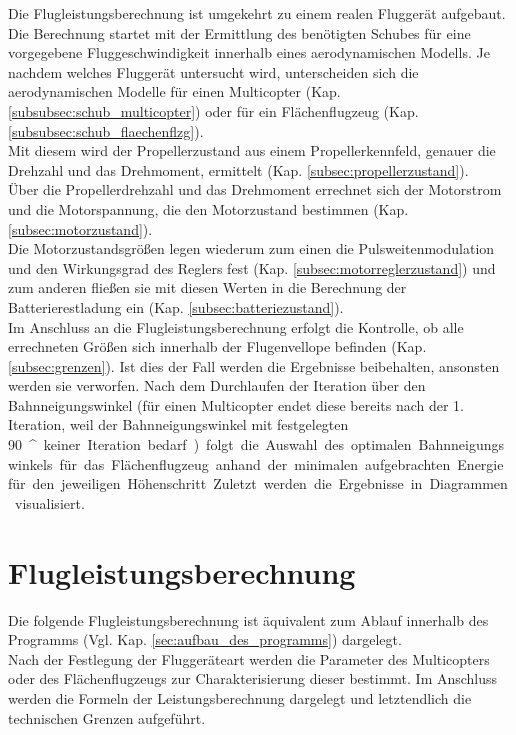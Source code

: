 Die Flugleistungsberechnung ist umgekehrt zu einem realen Fluggerät aufgebaut.
Die Berechnung startet mit der Ermittlung des benötigten Schubes für eine vorgegebene Fluggeschwindigkeit innerhalb eines aerodynamischen Modells. Je nachdem welches Fluggerät untersucht wird, unterscheiden sich die aerodynamischen Modelle für einen Multicopter (Kap. \ref{subsubsec:schub_multicopter}) oder für ein Flächenflugzeug (Kap. \ref{subsubsec:schub_flaechenflzg}). \\
Mit diesem wird der Propellerzustand aus einem Propellerkennfeld, genauer die Drehzahl und das Drehmoment, ermittelt (Kap. \ref{subsec:propellerzustand}). \\
Über die Propellerdrehzahl und das Drehmoment errechnet sich der Motorstrom und die Motorspannung, die den Motorzustand bestimmen (Kap. \ref{subsec:motorzustand}). \\
Die Motorzustandsgrößen legen wiederum zum einen die Pulsweitenmodulation und den Wirkungsgrad des Reglers fest (Kap. \ref{subsec:motorreglerzustand}) und zum anderen fließen sie mit diesen Werten in die Berechnung der Batterierestladung ein (Kap. \ref{subsec:batteriezustand}). \\
Im Anschluss an die Flugleistungsberechnung erfolgt die Kontrolle, ob alle errechneten Größen sich innerhalb der Flugenvellope befinden (Kap. \ref{subsec:grenzen}). Ist dies der Fall werden die Ergebnisse beibehalten, ansonsten werden sie verworfen. 
Nach dem Durchlaufen der Iteration über den Bahnneigungswinkel (für einen Multicopter endet diese bereits nach der 1. Iteration, weil der Bahnneigungswinkel mit festgelegten \SI{90}{^\circ} keiner Iteration bedarf) folgt die Auswahl des optimalen Bahnneigungswinkels für das Flächenflugzeug anhand der minimalen aufgebrachten Energie für den jeweiligen Höhenschritt.
Zuletzt werden die Ergebnisse in Diagrammen visualisiert.



\section{Flugleistungsberechnung}
\label{sec:flugleistungsberechnung}
Die folgende Flugleistungsberechnung ist äquivalent zum Ablauf innerhalb des Programms (Vgl. Kap. \ref{sec:aufbau_des_programms}) dargelegt. \\
Nach der Festlegung der Fluggeräteart werden die Parameter des Multicopters oder des Flächenflugzeugs zur Charakterisierung dieser bestimmt. Im Anschluss werden die Formeln der Leistungsberechnung dargelegt und letztendlich die technischen Grenzen aufgeführt. 

